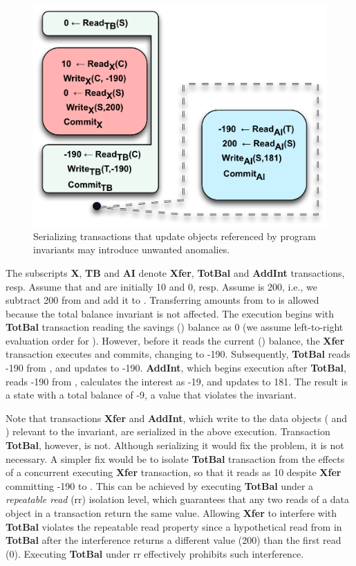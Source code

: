 \begin{figure}[!h]
\centering
\includegraphics[scale=0.5]{Figures/motiv-eg-3-a}
\caption{Serializing transactions that update objects referenced by
  program invariants may introduce unwanted anomalies.}
\label{fig:motiv-eg-3-a}
\end{figure}

The subscripts {\bf X}, {\bf TB} and {\bf AI} denote {\bf Xfer}, {\bf
  TotBal} and {\bf AddInt} transactions, resp. Assume that  and
 are initially 10 and 0, resp.  Assume  is 200, i.e., we
subtract 200 from  and add it to .  Transferring amounts
from  to  is allowed because the total balance invariant is
not affected.  The execution begins with {\bf TotBal} transaction
reading the savings () balance as 0 (we assume left-to-right
evaluation order for ).  However, before it reads the current
() balance, the {\bf Xfer} transaction executes and commits,
changing  to -190.  Subsequently, {\bf TotBal} reads -190 from
, and updates  to -190. {\bf AddInt}, which begins execution
after {\bf TotBal}, reads -190 from , calculates the interest as
-19, and updates  to 181. The result is a state with a total
balance of -9, a value that violates the invariant.

Note that transactions {\bf Xfer} and {\bf AddInt}, which write to the
data objects ( and ) relevant to the invariant, are
serialized in the above execution. Transaction {\bf TotBal}, however,
is not.  Although serializing it would fix the problem, it is not
necessary. A simpler fix would be to isolate {\bf TotBal} transaction
from the effects of a concurrent executing {\bf Xfer} transaction, so
that it reads  as 10 despite {\bf Xfer} committing -190 to
. This can be achieved by executing {\bf TotBal} under a
\emph{repeatable read} ({\sc rr}) isolation level, which guarantees
that any two reads of a data object in a transaction return the same
value.  Allowing {\bf Xfer} to interfere with {\bf TotBal} violates
the repeatable read property since a hypothetical read from  in
{\bf TotBal} after the interference returns a different value (200)
than the first read (0). Executing {\bf TotBal} under {\sc rr}
effectively prohibits such interference.

